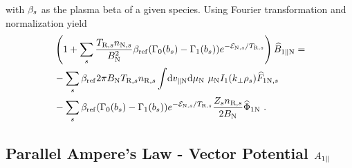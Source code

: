 with $\beta_s$ as the plasma beta of a given species. Using Fourier transformation and normalization yield
\begin{gather}
    \begin{aligned}
        &\left(1 + \sum_s \frac{T_{\mathrm{R},s}n_{\mathrm{N},s}}{B_\mathrm{N}^2} \beta_\mathrm{ref} (\Gamma_0(b_s) - \Gamma_1(b_s)) e^{-\mathcal{E}_{\mathrm{N},s}/T_{\mathrm{R},s}}\right) \widehat{B}_{1\parallel \mathrm{N}} = \\
        &-\sum_s \beta_\mathrm{ref} 2\pi B_\mathrm{N} T_{\mathrm{R},s} n_{\mathrm{R},s} \int \! \mathrm{d}v_{\parallel \mathrm{N}} \mathrm{d}\mu_\mathrm{N} ~ \mu_\mathrm{N} I_1(k_\perp \rho_s) \widehat{F}_{1\mathrm{N},s} \\
        &-\sum_s \beta_\mathrm{ref} (\Gamma_0(b_s) - \Gamma_1(b_s)) e^{-\mathcal{E}_{\mathrm{N},s}/T_{\mathrm{R},s}} \frac{Z_sn_{\mathrm{R},s}}{2 B_\mathrm{N}} \widehat{\Phi}_{1 \mathrm{N}} ~.
    \end{aligned}
\end{gather}
\newpage

\subsection{Parallel Ampere's Law - Vector Potential $A_{1\parallel}$}
\label{sub:fieldInduction}

